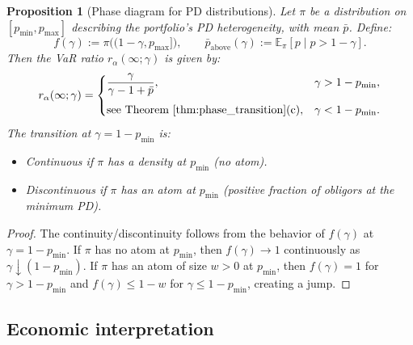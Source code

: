 \documentclass[11pt]{article}
\newtheorem{proposition}[theorem]{Proposition}
\theoremstyle{definition}
\newcommand{\E}{\mathbb{E}}
\newcommand{\1}{\mathbf{1}}
\begin{document}
\begin{proposition}[Phase diagram for PD distributions]\label{prop:phase_diagram}
Let $\pi$ be a distribution on $[p_{\min}, p_{\max}]$ describing the portfolio's PD heterogeneity, with mean $\bar{p}$. Define:
\begin{equation}\label{eq:phase_functions}
  f(\gamma) := \pi\!\bigl((1-\gamma, p_{\max}]\bigr), \qquad
  \bar{p}_{\mathrm{above}}(\gamma) := \E_\pi[p \mid p > 1-\gamma].
\end{equation}
Then the VaR ratio $r_\alpha(\infty; \gamma)$ is given by:
\begin{equation}\label{eq:phase_ratio}
  r_\alpha(\infty; \gamma) = \begin{cases}
    \displaystyle \frac{\gamma}{\gamma - 1 + \bar{p}}, & \gamma > 1 - p_{\min}, \\[10pt]
    \text{see Theorem~\ref{thm:phase_transition}(c)}, & \gamma < 1 - p_{\min}.
  \end{cases}
\end{equation}
The transition at $\gamma = 1 - p_{\min}$ is:
\begin{itemize}
  \item \emph{Continuous} if $\pi$ has a density at $p_{\min}$ (no atom).
  \item \emph{Discontinuous} if $\pi$ has an atom at $p_{\min}$ (positive fraction of obligors at the minimum PD).
\end{itemize}
\end{proposition}

\begin{proof}
The continuity/discontinuity follows from the behavior of $f(\gamma)$ at $\gamma = 1 - p_{\min}$. If $\pi$ has no atom at $p_{\min}$, then $f(\gamma) \to 1$ continuously as $\gamma \downarrow (1-p_{\min})$. If $\pi$ has an atom of size $w > 0$ at $p_{\min}$, then $f(\gamma) = 1$ for $\gamma > 1-p_{\min}$ and $f(\gamma) \leq 1 - w$ for $\gamma \leq 1-p_{\min}$, creating a jump.
\end{proof}

\subsection{Economic interpretation}
\end{document}
